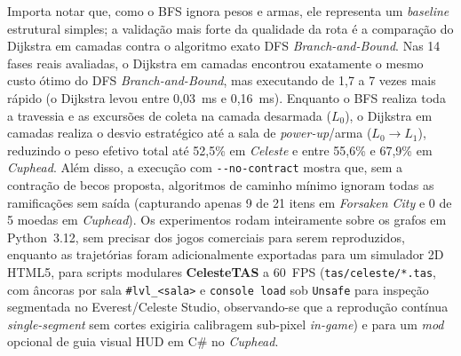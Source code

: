 \documentclass[conference]{IEEEtran}
\begin{document}
Importa notar que, como o BFS ignora pesos e armas, ele representa um \textit{baseline} estrutural simples; a valida\c{c}\~ao mais forte da qualidade da rota \'e a compara\c{c}\~ao do Dijkstra em camadas contra o algoritmo exato DFS \textit{Branch-and-Bound}. Nas 14 fases reais avaliadas, o Dijkstra em camadas encontrou exatamente o mesmo custo \'otimo do DFS \textit{Branch-and-Bound}, mas executando de 1,7 a 7 vezes mais r\'apido (o Dijkstra levou entre 0,03~ms e 0,16~ms). Enquanto o BFS realiza toda a travessia e as excurs\~oes de coleta na camada desarmada ($L_0$), o Dijkstra em camadas realiza o desvio estrat\'egico at\'e a sala de \textit{power-up}/arma ($L_0 \to L_1$), reduzindo o peso efetivo total at\'e 52,5\% em \textit{Celeste} e entre 55,6\% e 67,9\% em \textit{Cuphead}. Al\'em disso, a execu\c{c}\~ao com \texttt{-{}-no-contract} mostra que, sem a contra\c{c}\~ao de becos proposta, algoritmos de caminho m\'inimo ignoram todas as ramifica\c{c}\~oes sem sa\'ida (capturando apenas 9 de 21 itens em \textit{Forsaken City} e 0 de 5 moedas em \textit{Cuphead}). Os experimentos rodam inteiramente sobre os grafos em Python~3.12, sem precisar dos jogos comerciais para serem reproduzidos, enquanto as trajet\'orias foram adicionalmente exportadas para um simulador 2D HTML5, para scripts modulares \textbf{CelesteTAS} a 60~FPS (\texttt{tas/celeste/*.tas}, com \^ancoras por sala \texttt{\#lvl\_<sala>} e \texttt{console load} sob \texttt{Unsafe} para inspe\c{c}\~ao segmentada no Everest/Celeste Studio, observando-se que a reprodu\c{c}\~ao cont\'inua \textit{single-segment} sem cortes exigiria calibragem sub-pixel \textit{in-game}) e para um \textit{mod} opcional de guia visual HUD em C\# no \textit{Cuphead}.
\end{document}
